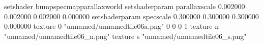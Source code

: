 setshader bumpspecmapparallaxworld
setshaderparam parallaxscale 0.002000 0.002000 0.002000 0.000000
setshaderparam specscale 0.300000 0.300000 0.300000 0.000000
texture 0 "unnamed/unnamedtile06a.png" 0 0 0 1
texture n "unnamed/unnamedtile06_n.png"
texture s "unnamed/unnamedtile06_s.png"